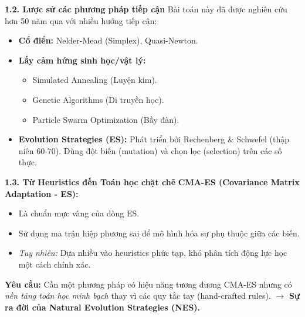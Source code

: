 \documentclass[10pt,xcolor=dvipsnames]{beamer}
\begin{document}
\begin{frame}{\textbf{1.2. Lược sử các phương pháp tiếp cận}}
	Bài toán này đã được nghiên cứu hơn 50 năm qua với nhiều hướng tiếp cận:
	\begin{itemize}
		\item \textbf{Cổ điển:} Nelder-Mead (Simplex), Quasi-Newton.
		\item \textbf{Lấy cảm hứng sinh học/vật lý:}
		\begin{itemize}
			\item Simulated Annealing (Luyện kim).
			\item Genetic Algorithms (Di truyền học).
			\item Particle Swarm Optimization (Bầy đàn).
		\end{itemize}
		\item \textbf{Evolution Strategies (ES):} 
		Phát triển bởi Rechenberg \& Schwefel (thập niên 60-70). Dùng đột biến (mutation) và chọn lọc (selection) trên các số thực.
	\end{itemize}
\end{frame}

\begin{frame}{\textbf{1.3. Từ Heuristics đến Toán học chặt chẽ}}
	\textbf{CMA-ES (Covariance Matrix Adaptation - ES):}
	\begin{itemize}
		\item Là chuẩn mực vàng của dòng ES.
		\item Sử dụng ma trận hiệp phương sai để mô hình hóa sự phụ thuộc giữa các biến.
		\item \textit{Tuy nhiên:} Dựa nhiều vào heuristics phức tạp, khó phân tích động lực học một cách chính xác.
	\end{itemize}
	
	\vspace{0.3cm}
	\textbf{Yêu cầu:}
	Cần một phương pháp có hiệu năng tương đương CMA-ES nhưng có \textit{nền tảng toán học minh bạch} thay vì các quy tắc tay (hand-crafted rules).
	$\rightarrow$ \textbf{Sự ra đời của Natural Evolution Strategies (NES).}
\end{frame}
\end{document}
